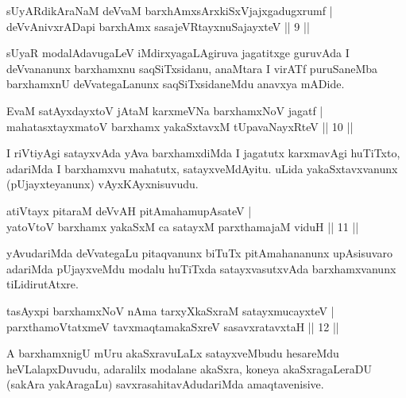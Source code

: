 \begin{shl}
sUyARdikAraNaM deVvaM barxhAmx\s sArxkiSxVjajxgadugxrumf | \\
deVvAnivxrADapi barxhAmx sasajeVRtayxnuSajayxteV \hfill ||  9 || 
\end{shl}

\begin{artha}
sUyaR modalAdavugaLeV iMdirxyagaLAgiruva jagatitxge guruvAda I deVvananunx barxhamxnu saqSiTxsidanu, anaMtara I virATf puruSaneMba barxhamxnU deVvategaLanunx saqSiTxsidaneMdu anavxya mADide.
\end{artha}

\begin{shl}
EvaM satAyxdayxtoV jAtaM karxmeVNa barxhamxNoV jagatf | \\
mahatasxtayxmatoV barxhamx yakaSxtavxM tUpavaNayxRteV \hfill ||  10 || 
\end{shl}

\begin{artha}
I riVtiyAgi satayxvAda yAva barxhamxdiMda I jagatutx karxmavAgi huTiTxto, adariMda I barxhamxvu mahatutx, satayxveMdAyitu. uLida yakaSxtavxvanunx (pUjayxteyanunx) vAyxKAyxnisuvudu.
\end{artha}

\begin{shl}
atiVtayx pitaraM deVvAH pitAmahamupAsateV | \\
yatoV\s toV barxhamx yakaSxM ca satayxM parxthamajaM viduH \hfill ||  11 || 
\end{shl}

\begin{artha}
yAvudariMda deVvategaLu pitaqvanunx biTuTx pitAmahananunx upAsisuvaro adariMda pUjayxveMdu modalu huTiTxda satayxvasutxvAda barxhamxvanunx tiLidirutAtxre.
\end{artha}


\begin{shl}
tasAyxpi barxhamxNoV nAma tarxyXkaSxraM satayxmucayxteV | \\
parxthamoVtatxmeV tavxmaqtamakaSxreV sasavxratavxtaH \hfill ||  12 || 
\end{shl}

\begin{artha}
A barxhamxnigU mUru akaSxravuLaLx satayxveMbudu hesareMdu heVLalapxDuvudu, adaralilx modalane akaSxra, koneya akaSxragaLeraDU (sakAra yakAragaLu) savxrasahitavAdudariMda amaqtavenisive.
\end{artha}

